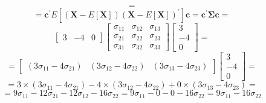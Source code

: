 \begin{enumerate}[label=(\alph*)]
\[                =
            \]
            \[
                =
                \textbf{c}^\prime E\left[\left(\textbf{X} - E\left[\textbf{X}\right]\right){\left(\textbf{X} - E\left[\textbf{X}\right]\right)}^\prime\right]\textbf{c}
                =
                \textbf{c}^\prime\mathbf{\Sigma}\textbf{c}
                =
            \]
            \[
                \begin{bmatrix}
                    3 & -4 & 0
                \end{bmatrix}
                \begin{bmatrix}
                    \sigma_{11} & \sigma_{12} & \sigma_{13} \\
                    \sigma_{21} & \sigma_{22} & \sigma_{23} \\
                    \sigma_{31} & \sigma_{32} & \sigma_{33}
                \end{bmatrix}
                \begin{bmatrix}
                    3 \\
                    -4 \\
                    0
                \end{bmatrix}
                =
            \]
            \[
                =
                \begin{bmatrix}
                    \left(3 \sigma_{11} - 4 \sigma_{21}\right) &
                    \left(3 \sigma_{12} - 4 \sigma_{22}\right) &
                    \left(3 \sigma_{13} - 4 \sigma_{23}\right)
                \end{bmatrix}
                \begin{bmatrix}
                    3 \\
                    -4 \\
                    0
                \end{bmatrix}
                =
            \]
            \[
                =
                3 \times \left(3 \sigma_{11} - 4 \sigma_{21}\right) - 4 \times \left(3 \sigma_{12} - 4 \sigma_{22}\right)
                    + 0 \times \left(3 \sigma_{13} - 4 \sigma_{23}\right)
                =
            \]
            \[
                =
                9 \sigma_{11} - 12 \sigma_{21} - 12 \sigma_{12} - 16 \sigma_{22}=
                9 \sigma_{11} - 0 - 0 - 16 \sigma_{22}
                =
                9 \sigma_{11} - 16 \sigma_{22}
            \]
        \end{enumerate}